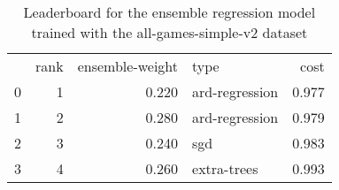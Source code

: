 \begin{table}[]
	\centering
	\begin{tabular}{lrrlr}
		  & rank & ensemble-weight & type           & cost  \\
		0 & 1    & 0.220           & ard-regression & 0.977 \\
		1 & 2    & 0.280           & ard-regression & 0.979 \\
		2 & 3    & 0.240           & sgd            & 0.983 \\
		3 & 4    & 0.260           & extra-trees    & 0.993 \\
	\end{tabular}

	\caption{Leaderboard for the ensemble regression model trained with the all-games-simple-v2 dataset}
	\label{tab:lb-reg-all-games-simple-v2}
\end{table}
